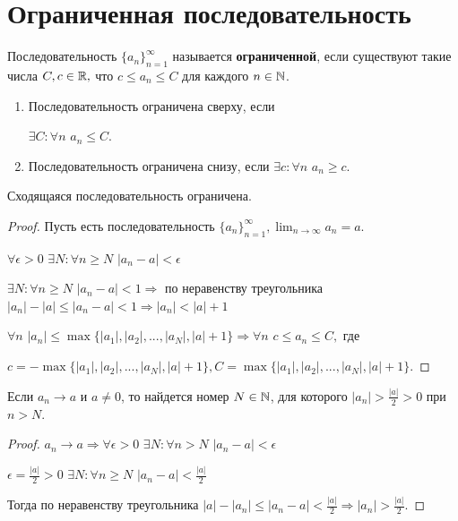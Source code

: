 	\section{Ограниченная последовательность}
	
	\begin{definition}
		Последовательность $\{a_n\}^{\infty}_{n = 1}$ называется \textbf{ограниченной}, если существуют такие числа $C, c \in \mathbb R,$ что $c \leqslant a_n \leqslant C$ для каждого $n \in \mathbb N$.
	\end{definition}
	
	\begin{mention}
		\begin{enumerate}
			\item Последовательность ограничена сверху, если
			
			$\exists C : \forall n$ $a_n \leqslant C$.
			\item Последовательность ограничена снизу, если $\exists c : \forall n$ $a_n \geqslant c$.
		\end{enumerate}
	\end{mention}
	
	\begin{sentence}
		Сходящаяся последовательность ограничена.
	\end{sentence}
	
	\begin{proof}
		Пусть есть последовательность $\{a_n\}^{\infty}_{n = 1}, \lim_{n \to \infty} a_n = a$.
		
		$\forall \epsilon > 0$ $\exists N: \forall n \geqslant N$ $|a_n - a| < \epsilon$
		
		$\exists N: \forall n \geqslant N$ $|a_n - a| < 1 \Rightarrow$ по неравенству треугольника $|a_n| - |a| \leqslant |a_n - a| < 1 \Rightarrow |a_n| < |a| + 1$
		
		$\forall n$ $|a_n| \leqslant \max\{|a_1|, |a_2|, ..., |a_N|, |a| + 1\} \Rightarrow \forall n$ $c \leqslant a_n \leqslant C,$ где
		
		$c = -\max\{|a_1|, |a_2|, ..., |a_N|, |a| + 1\}, C = \max\{|a_1|, |a_2|, ..., |a_N|, |a| + 1\}.$
	\end{proof}
	
	\begin{lemma}[Об отделимости]
		Если $a_n \rightarrow a$ и $a \neq 0$, то найдется номер $N \in \mathbb N$, для которого $|a_n| > \frac{|a|}{2} > 0$ при $n > N$.
	\end{lemma}
	
	\begin{proof}
		$a_n \to a \Rightarrow \forall \epsilon > 0$ $\exists N: \forall n > N$ $|a_n - a| < \epsilon$
		
		$\epsilon = \frac{|a|}{2} > 0$ $\exists N: \forall n \geqslant N$ $|a_n - a| < \frac{|a|}{2}$
		
		Тогда по неравенству треугольника $|a| - |a_n| \leqslant |a_n - a| < \frac{|a|}{2} \Rightarrow |a_n| > \frac{|a|}{2}.$
	\end{proof}
	

